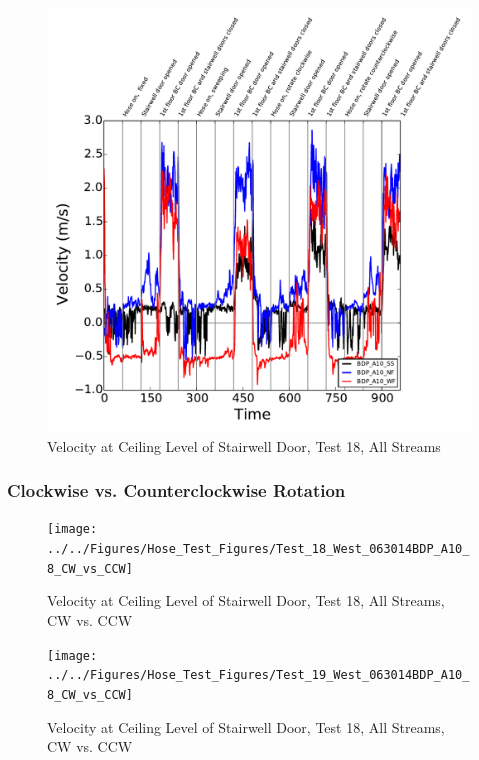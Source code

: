 \documentclass[12pt,oneside]{book}
\begin{document}
\begin{figure}[!ht]
\includegraphics[width=6in]{../../Figures/Hose_Test_Figures/Test_19_West_063014BDP_A10_8_All_Streams}
\caption{Velocity at Ceiling Level of Stairwell Door, Test 18, All Streams}
\label{fig:Test_18_West_063014_SS_BDP_A10}
\end{figure}

\clearpage

\subsubsection{Clockwise vs. Counterclockwise Rotation}

\begin{figure}[!ht]
\texttt{[image: ../../Figures/Hose\_Test\_Figures/Test\_18\_West\_063014BDP\_A10\_8\_CW\_vs\_CCW]}
\caption{Velocity at Ceiling Level of Stairwell Door, Test 18, All Streams, CW vs. CCW}
\label{fig:Test_18_West_063014_SS_BDP_A10}
\end{figure}

\begin{figure}[!ht]
\texttt{[image: ../../Figures/Hose\_Test\_Figures/Test\_19\_West\_063014BDP\_A10\_8\_CW\_vs\_CCW]}
\caption{Velocity at Ceiling Level of Stairwell Door, Test 18, All Streams, CW vs. CCW}
\label{fig:Test_18_West_063014_SS_BDP_A10}
\end{figure}
\end{document}

